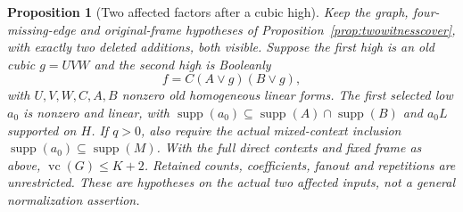 \documentclass[11pt]{article}
\newcommand{\supp}{\operatorname{supp}}
\newcommand{\vc}{\operatorname{vc}}
\newtheorem{proposition}[theorem]{Proposition}
\theoremstyle{definition}
\theoremstyle{remark}
\begin{document}
\begin{proposition}[Two affected factors after a cubic high]
\label{prop:twoaffectedcover}
Keep the graph, four-missing-edge and original-frame hypotheses of
Proposition~\ref{prop:twowitnesscover}, with exactly two deleted additions,
both visible. Suppose the first high is an old cubic $g=UVW$ and the
second high is Booleanly
\[
 f=C(A\vee g)(B\vee g),
\]
with $U,V,W,C,A,B$ nonzero old homogeneous linear forms. The first
selected low $a_0$ is nonzero and linear, with
$\supp(a_0)\subseteq\supp(A)\cap\supp(B)$ and $a_0L$ supported on $H$.
If $q>0$, also require the actual mixed-context inclusion
$\supp(a_0)\subseteq\supp(M)$. With the full direct contexts and fixed
frame as above, $\vc(G)\le K+2$. Retained counts, coefficients, fanout and
repetitions are unrestricted. These are hypotheses on the actual two
affected inputs, not a general normalization assertion.
\end{proposition}
\end{document}
